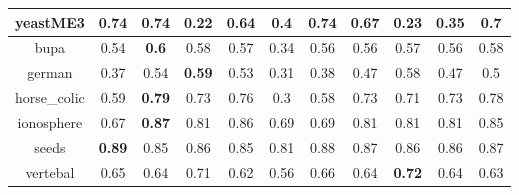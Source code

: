 \documentclass{article}%
\begin{document}
\begin{tabular}{c|cccccccccc}
\hline%
yeastME3&\textbf{0.74}&\textbf{0.74}&0.22&0.64&0.4&\textbf{0.74}&0.67&0.23&0.35&0.7\\%
\hline%
bupa&0.54&\textbf{0.6}&0.58&0.57&0.34&0.56&0.56&0.57&0.56&0.58\\%
\hline%
german&0.37&0.54&\textbf{0.59}&0.53&0.31&0.38&0.47&0.58&0.47&0.5\\%
\hline%
horse\_colic&0.59&\textbf{0.79}&0.73&0.76&0.3&0.58&0.73&0.71&0.73&0.78\\%
\hline%
ionosphere&0.67&\textbf{0.87}&0.81&0.86&0.69&0.69&0.81&0.81&0.81&0.85\\%
\hline%
seeds&\textbf{0.89}&0.85&0.86&0.85&0.81&0.88&0.87&0.86&0.86&0.87\\%
\hline%
vertebal&0.65&0.64&0.71&0.62&0.56&0.66&0.64&\textbf{0.72}&0.64&0.63\\%
\hline%
\end{tabular}

%
\end{document}
